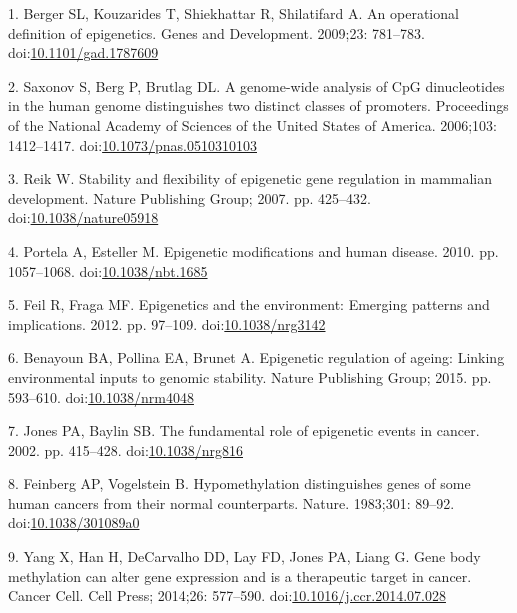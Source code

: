 \documentclass[10pt,letterpaper]{article}
\begin{document}
\hypertarget{refs}{}
\leavevmode\hypertarget{ref-Berger2009}{}%
1. Berger SL, Kouzarides T, Shiekhattar R, Shilatifard A. An operational
definition of epigenetics. Genes and Development. 2009;23: 781--783.
doi:\href{https://doi.org/10.1101/gad.1787609}{10.1101/gad.1787609}

\leavevmode\hypertarget{ref-Saxonov2006}{}%
2. Saxonov S, Berg P, Brutlag DL. A genome-wide analysis of CpG
dinucleotides in the human genome distinguishes two distinct classes of
promoters. Proceedings of the National Academy of Sciences of the United
States of America. 2006;103: 1412--1417.
doi:\href{https://doi.org/10.1073/pnas.0510310103}{10.1073/pnas.0510310103}

\leavevmode\hypertarget{ref-Reik2007}{}%
3. Reik W. Stability and flexibility of epigenetic gene regulation in
mammalian development. Nature Publishing Group; 2007. pp. 425--432.
doi:\href{https://doi.org/10.1038/nature05918}{10.1038/nature05918}

\leavevmode\hypertarget{ref-Portela2010}{}%
4. Portela A, Esteller M. Epigenetic modifications and human disease.
2010. pp. 1057--1068.
doi:\href{https://doi.org/10.1038/nbt.1685}{10.1038/nbt.1685}

\leavevmode\hypertarget{ref-Feil2012}{}%
5. Feil R, Fraga MF. Epigenetics and the environment: Emerging patterns
and implications. 2012. pp. 97--109.
doi:\href{https://doi.org/10.1038/nrg3142}{10.1038/nrg3142}

\leavevmode\hypertarget{ref-Benayoun2015}{}%
6. Benayoun BA, Pollina EA, Brunet A. Epigenetic regulation of ageing:
Linking environmental inputs to genomic stability. Nature Publishing
Group; 2015. pp. 593--610.
doi:\href{https://doi.org/10.1038/nrm4048}{10.1038/nrm4048}

\leavevmode\hypertarget{ref-Jones2002}{}%
7. Jones PA, Baylin SB. The fundamental role of epigenetic events in
cancer. 2002. pp. 415--428.
doi:\href{https://doi.org/10.1038/nrg816}{10.1038/nrg816}

\leavevmode\hypertarget{ref-Feinberg1983}{}%
8. Feinberg AP, Vogelstein B. Hypomethylation distinguishes genes of
some human cancers from their normal counterparts. Nature. 1983;301:
89--92. doi:\href{https://doi.org/10.1038/301089a0}{10.1038/301089a0}

\leavevmode\hypertarget{ref-Yang2014}{}%
9. Yang X, Han H, DeCarvalho DD, Lay FD, Jones PA, Liang G. Gene body
methylation can alter gene expression and is a therapeutic target in
cancer. Cancer Cell. Cell Press; 2014;26: 577--590.
doi:\href{https://doi.org/10.1016/j.ccr.2014.07.028}{10.1016/j.ccr.2014.07.028}
\end{document}
